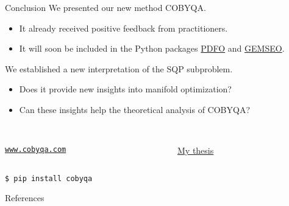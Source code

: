 \documentclass[
]{talk}
\begin{document}
\begin{frame}{Conclusion}
    We presented our new method COBYQA.
    \begin{itemize}
        \item It already received \alert{positive} feedback from practitioners.
        \item It will soon be included in the Python packages \href{https://www.pdfo.net}{PDFO} and \href{https://gemseo.readthedocs.io}{GEMSEO}.
    \end{itemize}

    We established a new interpretation of the SQP subproblem.
    \begin{itemize}
        \item Does it provide new insights into \alert{manifold optimization}?
        \item Can these insights help the theoretical analysis of COBYQA?
    \end{itemize}

    \begin{columns}
        \begin{column}{0.5\textwidth}
            \begin{center}
                \\[1ex]
                \href{https://www.cobyqa.com}{\texttt{www.cobyqa.com}}
            \end{center}
        \end{column}
        \begin{column}{0.5\textwidth}
            \begin{center}
                \\[1ex]
                \href{http://tomragonneau.com/documents/thesis.pdf}{My thesis}
            \end{center}
        \end{column}
    \end{columns}

    \medskip

    \begin{block}{}
        \texttt{\$ pip install cobyqa}
    \end{block}
\end{frame}


\appendix
\begin{frame}[t,allowframebreaks]{References}
    \printbibliography[heading=none]
\end{frame}
\end{document}

